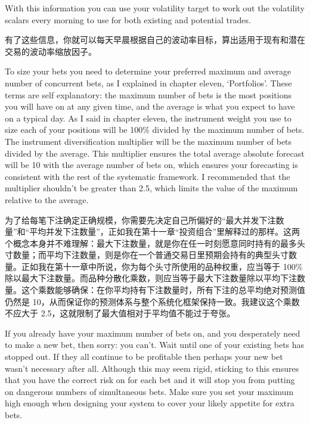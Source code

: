 \begin{englishblock} With this information you can use your volatility target to work out the volatility scalars every morning to use for both existing and potential trades. \end{englishblock}

\begin{chineseblock}有了这些信息，你就可以每天早晨根据自己的波动率目标，算出适用于现有和潜在交易的波动率缩放因子。\end{chineseblock}


\begin{englishblock} To size your bets you need to determine your preferred maximum and average number of concurrent bets, as I explained in chapter eleven, ‘Portfolios'. These terms are self explanatory: the maximum number of bets is the most positions you will have on at any given time, and the average is what you expect to have on a typical day. As I said in chapter eleven, the instrument weight you use to size each of your positions will be 100\% divided by the maximum number of bets. The instrument diversification multiplier will be the maximum number of bets divided by the average. This multiplier ensures the total average absolute forecast will be 10 with the average number of bets on, which ensures your forecasting is consistent with the rest of the systematic framework. I recommended that the multiplier shouldn't be greater than 2.5, which limits the value of the maximum relative to the average. \end{englishblock}

\begin{chineseblock}为了给每笔下注确定正确规模，你需要先决定自己所偏好的“最大并发下注数量”和“平均并发下注数量”，正如我在第十一章“投资组合”里解释过的那样。这两个概念本身并不难理解：最大下注数量，就是你在任一时刻愿意同时持有的最多头寸数量；而平均下注数量，则是你在一个普通交易日里预期会持有的典型头寸数量。正如我在第十一章中所说，你为每个头寸所使用的品种权重，应当等于 100\% 除以最大下注数量。而品种分散化乘数，则应当等于最大下注数量除以平均下注数量。这个乘数能够确保：在你平均持有下注数量时，所有下注的总平均绝对预测值仍然是 10，从而保证你的预测体系与整个系统化框架保持一致。我建议这个乘数不应大于 2.5，这就限制了最大值相对于平均值不能过于夸张。\end{chineseblock}

\bipairgap

\begin{englishblock} If you already have your maximum number of bets on, and you desperately need to make a new bet, then sorry: you can't. Wait until one of your existing bets has stopped out. If they all continue to be profitable then perhaps your new bet wasn't necessary after all. Although this may seem rigid, sticking to this ensures that you have the correct risk on for each bet and it will stop you from putting on dangerous numbers of simultaneous bets. Make sure you set your maximum high enough when designing your system to cover your likely appetite for extra bets. \end{englishblock}

